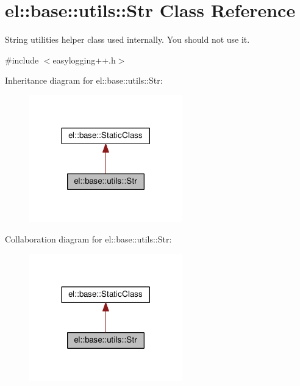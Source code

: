 \hypertarget{classel_1_1base_1_1utils_1_1_str}{}\section{el\+:\+:base\+:\+:utils\+:\+:Str Class Reference}
\label{classel_1_1base_1_1utils_1_1_str}


String utilities helper class used internally. You should not use it.  




{\ttfamily \#include $<$easylogging++.\+h$>$}



Inheritance diagram for el\+:\+:base\+:\+:utils\+:\+:Str\+:
\nopagebreak
\begin{figure}[H]
\begin{center}
\leavevmode
\includegraphics[width=188pt]{classel_1_1base_1_1utils_1_1_str__inherit__graph}
\end{center}
\end{figure}


Collaboration diagram for el\+:\+:base\+:\+:utils\+:\+:Str\+:
\nopagebreak
\begin{figure}[H]
\begin{center}
\leavevmode
\includegraphics[width=188pt]{classel_1_1base_1_1utils_1_1_str__coll__graph}
\end{center}
\end{figure}

